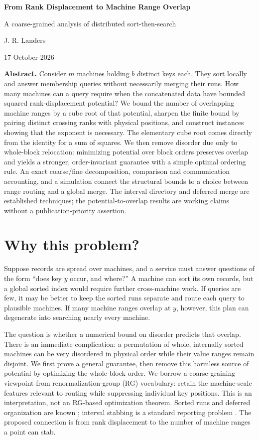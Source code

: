 \documentclass[10pt,letterpaper]{article}
\begin{document}
\vspace*{.08in}
\begin{center}
{\LARGE\bfseries From Rank Displacement to Machine Range Overlap}\par
\vspace{3pt}
{\large A coarse-grained analysis of distributed sort-then-search}\par
\vspace{5pt}
J. R. Landers\par
\vspace{7pt}
{\small 17 October 2026}
\end{center}
\textbf{Abstract.} Consider $m$ machines holding $b$ distinct keys each. They sort locally and answer membership queries without necessarily merging their runs. How many machines can a query require when the concatenated data have bounded squared rank-displacement potential? We bound the number of overlapping machine ranges by a cube root of that potential, sharpen the finite bound by pairing distinct crossing ranks with physical positions, and construct instances showing that the exponent is necessary. The elementary cube root comes directly from the identity for a sum of squares. We then remove disorder due only to whole-block relocation: minimizing potential over block orders preserves overlap and yields a stronger, order-invariant guarantee with a simple optimal ordering rule. An exact coarse/fine decomposition, comparison and communication accounting, and a simulation connect the structural bounds to a choice between range routing and a global merge. The interval directory and deferred merge are established techniques; the potential-to-overlap results are working claims without a publication-priority assertion.

\section{Why this problem?}
Suppose records are spread over machines, and a service must answer questions of the form ``does key $y$ occur, and where?'' A machine can sort its own records, but a global sorted index would require further cross-machine work. If queries are few, it may be better to keep the sorted runs separate and route each query to plausible machines. If many machine ranges overlap at $y$, however, this plan can degenerate into searching nearly every machine.

The question is whether a numerical bound on disorder predicts that overlap. There is an immediate complication: a permutation of whole, internally sorted machines can be very disordered in physical order while their value ranges remain disjoint. We first prove a general guarantee, then remove this harmless source of potential by optimizing the whole-block order. We borrow a coarse-graining viewpoint from renormalization-group (RG) vocabulary: retain the machine-scale features relevant to routing while suppressing individual key positions. This is an interpretation, not an RG-based optimization theorem. Sorted runs and deferred organization are known \cite{barbay}; interval stabbing is a standard reporting problem \cite{akram}. The proposed connection is from rank displacement to the number of machine ranges a point can stab.
\end{document}
